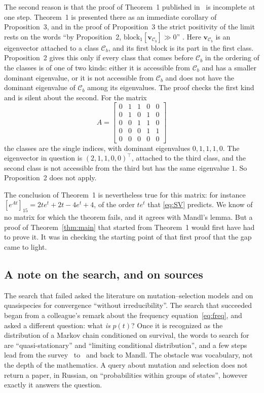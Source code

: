 \documentclass[11pt]{article}
\theoremstyle{definition}
\theoremstyle{remark}
\newcommand{\T}{\top}
\begin{document}
The second reason is that the proof of Theorem~1 published in~\cite{SV07} is incomplete at one
step. Theorem~1 is presented there as an immediate corollary of Proposition~3, and in the proof
of Proposition~3 the strict positivity of the limit rests on the words ``by Proposition~2,
$\mathrm{block}_1[\mathbf{v}_{\mathcal{C}_b}] \gg 0$'' \cite[p.~296]{SV07}. Here
$\mathbf{v}_{\mathcal{C}_b}$ is an eigenvector attached to a class $\mathcal{C}_b$, and its
first block is its part in the first class. Proposition~2 \cite[p.~292]{SV07} gives this only
if every class that comes before $\mathcal{C}_b$ in the ordering of the classes is of one of two
kinds: either it is accessible from $\mathcal{C}_b$ and has a smaller dominant eigenvalue, or it
is not accessible from $\mathcal{C}_b$ and does not have the dominant eigenvalue of
$\mathcal{C}_b$ among its eigenvalues. The proof checks the first kind and is silent about the
second. For the matrix
\[
  A = \begin{bmatrix}
        0 & 1 & 1 & 0 & 0 \\
        0 & 1 & 0 & 1 & 0 \\
        0 & 0 & 1 & 1 & 0 \\
        0 & 0 & 0 & 1 & 1 \\
        0 & 0 & 0 & 0 & 0
      \end{bmatrix}
\]
the classes are the single indices, with dominant eigenvalues $0, 1, 1, 1, 0$. The eigenvector
in question is $(2, 1, 1, 0, 0)^\T$, attached to the third class, and the second class is not
accessible from the third but has the same eigenvalue $1$. So Proposition~2 does not apply.

The conclusion of Theorem~1 is nevertheless true for this matrix: for instance
$[e^{At}]_{15} = 2te^{t} + 2t - 4e^{t} + 4$, of the order $t e^{t}$ that \eqref{eq:SV} predicts.
We know of no matrix for which the theorem fails, and it agrees with Mandl's lemma. But a proof
of Theorem~\ref{thm:main} that started from Theorem~1 would first have had to prove it. It was
in checking the starting point of that first proof that the gap came to light.

\subsection{A note on the search, and on sources}\label{sec:related:search}

The search that failed asked the literature on mutation--selection models and on quasispecies
for convergence ``without irreducibility''. The search that succeeded began from a colleague's
remark about the frequency equation~\eqref{eq:freq}, and asked a different question: what
\emph{is} $p(t)$? Once it is recognized as the distribution of a Markov chain conditioned on
survival, the words to search for are ``quasi-stationary'' and ``limiting conditional
distribution'', and a few steps lead from the survey~\cite{vDP13} to~\cite{CV} and back
to Mandl. The obstacle was vocabulary, not the depth of the mathematics. A query about mutation
and selection does not return a paper, in Russian, on ``probabilities within groups of states'',
however exactly it answers the question.
\end{document}
